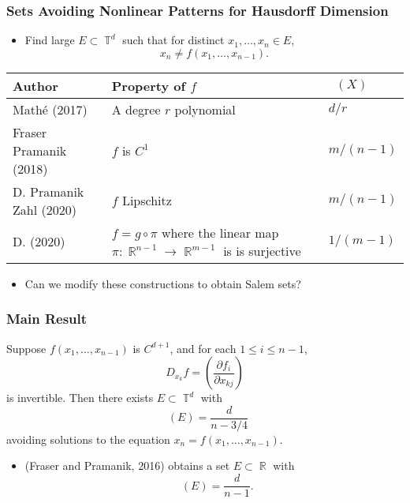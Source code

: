 \documentclass[handout,usenames,dvipsnames]{beamer}
\DeclareMathOperator{\RR}{\mathbb{R}}
\DeclareMathOperator{\TT}{\mathbb{T}}
\DeclareMathOperator{\fordim}{\text{dim}_{\mathbb{F}}}
\DeclareMathOperator{\hausdim}{\text{dim}_{\mathbb{H}}}
\begin{document}
\begin{frame}
    \frametitle{Sets Avoiding Nonlinear Patterns for Hausdorff Dimension}

    \begin{itemize}
        \pause
        \item Find large $E \subset \TT^d$ such that for distinct $x_1,\dots,x_n \in E$,
        \[ x_n \neq f(x_1,\dots,x_{n-1}). \]
    \end{itemize}

    \pause
    \begin{center}
    \begin{tabular}{| p{4cm} | p{4cm} | p{1.6cm} |}
        \hline
        \textbf{Author} & \textbf{Property of $f$} & $\hausdim(X)$\\
        \hline
        Math\'{e} (2017) & A degree $r$ polynomial & $d/r$\\
        \hline
        Fraser Pramanik (2018) & $f$ is $C^1$ & $m/(n-1)$\\
        \hline
        D. Pramanik Zahl (2020) & $f$ Lipschitz & $m/(n-1)$\\
        \hline
        D. (2020) & $f = g \circ \pi$ where the linear map $\pi: \RR^{n-1} \to \RR^{m-1}$ is is surjective & $1/(m-1)$\\
        \hline
    \end{tabular}
    \end{center}

    \begin{itemize}
        \item Can we modify these constructions to obtain Salem sets?
    \end{itemize}
\end{frame}







\begin{frame}
    \frametitle{Main Result}

    \begin{theorem}
        Suppose $f(x_1,\dots,x_{n-1})$ is $C^{d+1}$, and for each $1 \leq i \leq n-1$,
        \[ D_{x_k} f = \left( \frac{\partial f_i}{\partial x_{kj}} \right) \]
        is invertible. Then there exists $E \subset \TT^d$ with
        \[ \fordim(E) = \frac{d}{n - 3/4} \]
        avoiding solutions to the equation $x_n = f(x_1,\dots,x_{n-1})$.
    \end{theorem}

    \begin{itemize}
        \item (Fraser and Pramanik, 2016) obtains a set $E \subset \RR$ with
        \[ \hausdim(E) = \frac{d}{n - 1}. \]
    \end{itemize}
\end{frame}
\end{document}
